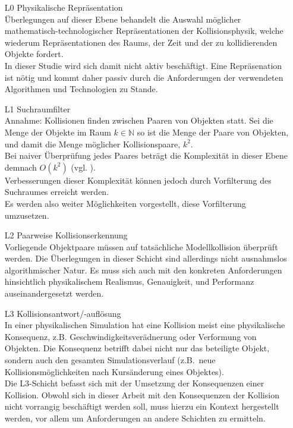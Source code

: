 \begin{itemize}
	\label{l0}
	\item[L0] Physikalische Repräsentation\\
		Überlegungen auf dieser Ebene behandelt die Auswahl möglicher mathematisch-technologischer Repräsentationen der Kollisionsphysik, welche wiederum Repräsentationen des Raums, der Zeit und der zu kollidierenden Objekte fordert.\\
		In dieser Studie wird sich damit nicht aktiv beschäftigt. Eine Repräsenation ist nötig und kommt daher passiv durch die Anforderungen der verwendeten Algorithmen und Technologien zu Stande.\\
			
	\label{l1}
	\item[L1] Suchraumfilter\\
		Annahme: Kollisionen finden zwischen Paaren von Objekten statt.
		Sei die Menge der Objekte im Raum $k\in\mathbb{N}$ so ist die Menge der Paare von Objekten, und damit die Menge möglicher Kollisionspaare, $k^2$.\\
		Bei naiver Überprüfung jedes Paares beträgt die Komplexität in dieser Ebene demnach $O(k^2)$ (vgl. \cite[Abschn. 2]{cd2D}).\\
		Verbesserungen dieser Komplexität können jedoch durch Vorfilterung des Suchraumes erreicht werden.\\
		Es werden also weiter Möglichkeiten vorgestellt, diese Vorfilterung umzusetzen.

	\label{l2}
	\item[L2] Paarweise Kollisionserkennung\\
		Vorliegende Objektpaare müssen auf tatsächliche Modellkollision überprüft werden.
		Die Überlegungen in dieser Schicht sind allerdings nicht ausnahmslos algorithmischer Natur. Es muss sich auch mit den konkreten Anforderungen hinsichtlich physikalischem Realismus, Genauigkeit, und Performanz auseinandergesetzt werden.

	\label{l3}
	\item[L3] Kollisionsantwort/-auflösung\\
		In einer physikalischen Simulation hat eine Kollision meist eine physikalische Konsequenz, z.B. Geschwindigkeitsverädnerung oder Verformung von Objekten. Die Konsequenz betrifft dabei nicht nur das beteiligte Objekt, sondern auch den gesamten Simulationsverlauf (z.B.~neue Kollisionsmöglichkeiten nach Kursänderung eines Objektes).\\
		Die L3-Schicht befasst sich mit der Umsetzung der Konsequenzen einer Kollision.
		Obwohl sich in dieser Arbeit mit den Konsequenzen der Kollision nicht vorrangig beschäftigt werden soll, muss hierzu ein Kontext hergestellt werden, vor allem um Anforderungen an andere Schichten zu ermitteln.
\end{itemize}

